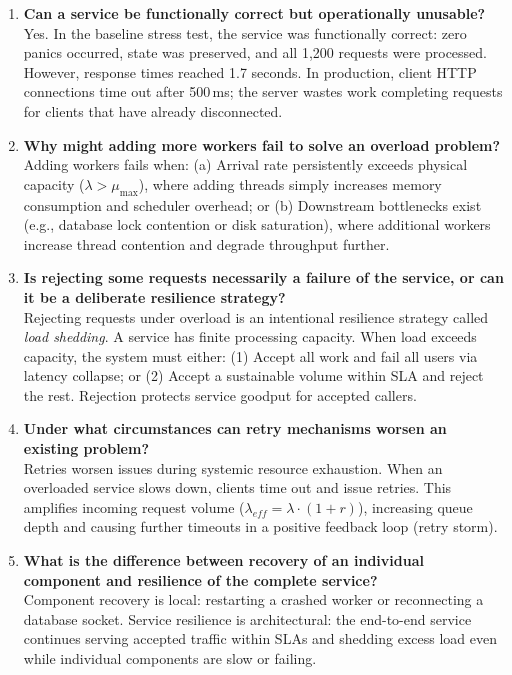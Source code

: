 \documentclass[11pt]{article}
\begin{document}
\begin{enumerate}[label=\textbf{Question \arabic*:}, leftmargin=1.5em, itemsep=0.45em]
    \item \textbf{Can a service be functionally correct but operationally unusable?}\\
    Yes. In the baseline stress test, the service was functionally correct: zero panics occurred, state was preserved, and all 1,200 requests were processed. However, response times reached 1.7 seconds. In production, client HTTP connections time out after 500\,ms; the server wastes work completing requests for clients that have already disconnected.

    \item \textbf{Why might adding more workers fail to solve an overload problem?}\\
    Adding workers fails when: (a) Arrival rate persistently exceeds physical capacity ($\lambda > \mu_{\max}$), where adding threads simply increases memory consumption and scheduler overhead; or (b) Downstream bottlenecks exist (e.g., database lock contention or disk saturation), where additional workers increase thread contention and degrade throughput further.

    \item \textbf{Is rejecting some requests necessarily a failure of the service, or can it be a deliberate resilience strategy?}\\
    Rejecting requests under overload is an intentional resilience strategy called \textit{load shedding}. A service has finite processing capacity. When load exceeds capacity, the system must either: (1) Accept all work and fail all users via latency collapse; or (2) Accept a sustainable volume within SLA and reject the rest. Rejection protects service goodput for accepted callers.

    \item \textbf{Under what circumstances can retry mechanisms worsen an existing problem?}\\
    Retries worsen issues during systemic resource exhaustion. When an overloaded service slows down, clients time out and issue retries. This amplifies incoming request volume ($\lambda_{eff} = \lambda \cdot (1 + r)$), increasing queue depth and causing further timeouts in a positive feedback loop (retry storm).

    \item \textbf{What is the difference between recovery of an individual component and resilience of the complete service?}\\
    Component recovery is local: restarting a crashed worker or reconnecting a database socket. Service resilience is architectural: the end-to-end service continues serving accepted traffic within SLAs and shedding excess load even while individual components are slow or failing.


\end{enumerate}
\end{document}
